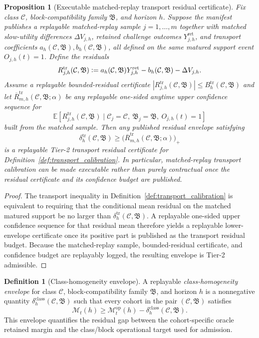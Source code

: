 \documentclass[11pt]{article}
\newtheorem{proposition}[theorem]{Proposition}
\theoremstyle{definition}
\newtheorem{definition}[theorem]{Definition}
\newcommand{\E}{\mathbb{E}}
\newcommand{\1}{\mathbf{1}}
\newcommand{\Defeq}{\vcentcolon=}
\begin{document}
\begin{proposition}[Executable matched-replay transport residual certificate]\label{prop:transport_radius}
Fix class $\mathcal C$, block-compatibility family $\mathfrak B$, and horizon $h$. Suppose the manifest publishes a replayable matched-replay sample $j=1,\dots,m$ together with matched slow-utility differences $\Delta V_{j,h}$, retained challenge outcomes $Y_{j,h}^{\mathrm{ret}}$, and transport coefficients $a_h(\mathcal C,\mathfrak B),b_h(\mathcal C,\mathfrak B)$, all defined on the same matured support event $O_{j,h}(t)=1$. Define the residuals
\[
R_{j,h}^{\mathrm{tr}}(\mathcal C,\mathfrak B)\Defeq a_h(\mathcal C,\mathfrak B)Y_{j,h}^{\mathrm{ret}}-b_h(\mathcal C,\mathfrak B)-\Delta V_{j,h}.
\]
Assume a replayable bounded-residual certificate $|R_{j,h}^{\mathrm{tr}}(\mathcal C,\mathfrak B)|\le B_h^{\mathrm{tr}}(\mathcal C,\mathfrak B)$ and let $\overline R_{m,h}^{\mathrm{tr}}(\mathcal C,\mathfrak B;\alpha)$ be any replayable one-sided anytime upper confidence sequence for
\[
\E[R_{j,h}^{\mathrm{tr}}(\mathcal C,\mathfrak B)\mid \mathcal C_j=\mathcal C,\ \mathfrak B_j=\mathfrak B,\ O_{j,h}(t)=1]
\]
built from the matched sample. Then any published residual envelope satisfying
\[
\delta_h^{\mathrm{tr}}(\mathcal C,\mathfrak B)\ge \bigl(\overline R_{m,h}^{\mathrm{tr}}(\mathcal C,\mathfrak B;\alpha)\bigr)_+
\]
is a replayable Tier-2 transport residual certificate for Definition~\ref{def:transport_calibration}. In particular, matched-replay transport calibration can be made executable rather than purely contractual once the residual certificate and its confidence budget are published.
\end{proposition}

\begin{proof}
The transport inequality in Definition~\ref{def:transport_calibration} is equivalent to requiring that the conditional mean residual on the matched matured support be no larger than $\delta_h^{\mathrm{tr}}(\mathcal C,\mathfrak B)$. A replayable one-sided upper confidence sequence for that residual mean therefore yields a replayable lower-envelope certificate once its positive part is published as the transport residual budget. Because the matched-replay sample, bounded-residual certificate, and confidence budget are replayably logged, the resulting envelope is Tier-2 admissible.
\end{proof}

\begin{definition}[Class-homogeneity envelope]\label{def:class_homogeneity}
A replayable \emph{class-homogeneity envelope} for class $\mathcal C$, block-compatibility family $\mathfrak B$, and horizon $h$ is a nonnegative quantity $\delta_h^{\mathrm{class}}(\mathcal C,\mathfrak B)$ such that every cohort in the pair $(\mathcal C,\mathfrak B)$ satisfies
\[
\mathcal M_t(h)\ge \mathcal M_t^{\mathrm{op}}(h)-\delta_h^{\mathrm{class}}(\mathcal C,\mathfrak B).
\]
This envelope quantifies the residual gap between the cohort-specific oracle retained margin and the class/block operational target used for admission.
\end{definition}
\end{document}
